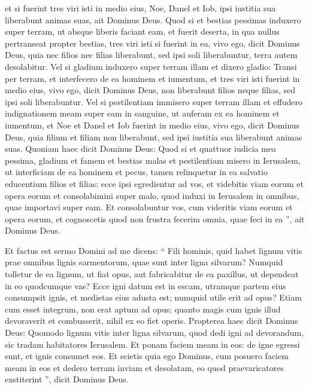 \begin{biblechapter}
\begin{biblechapter}
\begin{biblechapter}
\begin{biblechapter}
\begin{biblechapter}
\begin{biblechapter}
\begin{biblechapter}
\begin{biblechapter}
\begin{biblechapter}
\begin{biblechapter}
\begin{biblechapter}
\begin{biblechapter}
\begin{biblechapter}
\begin{biblechapter}
\verse et si fuerint tres viri isti in medio eius, Noe, Danel et Iob, ipsi iustitia sua liberabunt animas suas, ait Dominus Deus. 
\verse Quod si et bestias pessimas induxero super terram, ut absque liberis faciant eam, et fuerit deserta, in qua nullus pertranseat propter bestias, 
\verse tres viri isti si fuerint in ea, vivo ego, dicit Dominus Deus, quia nec filios nec filias liberabunt, sed ipsi soli liberabuntur, terra autem desolabitur. 
\verse Vel si gladium induxero super terram illam et dixero gladio: Transi per terram, et interfecero de ea hominem et iumentum, 
\verse et tres viri isti fuerint in medio eius, vivo ego, dicit Dominus Deus, non liberabunt filios neque filias, sed ipsi soli liberabuntur. 
\verse Vel si pestilentiam immisero super terram illam et effudero indignationem meam super eam in sanguine, ut auferam ex ea hominem et iumentum, 
\verse et Noe et Danel et Iob fuerint in medio eius, vivo ego, dicit Dominus Deus, quia filium et filiam non liberabunt, sed ipsi iustitia sua liberabunt animas suas.
 \verse Quoniam haec dicit Dominus Deus: Quod si et quattuor iudicia mea pessima, gladium et famem et bestias malas et pestilentiam misero in Ierusalem, ut interficiam de ea hominem et pecus, 
\verse tamen relinquetur in ea salvatio educentium filios et filias: ecce ipsi egredientur ad vos, et videbitis viam eorum et opera eorum et consolabimini super malo, quod induxi in Ierusalem in omnibus, quae importavi super eam. 
\verse Et consolabuntur vos, cum videritis viam eorum et opera eorum, et cognoscetis quod non frustra fecerim omnia, quae feci in ea ”, ait Dominus Deus.
 
\begin{biblechapter}
\verse Et factus est sermo Domini ad me dicens:
 \verse “ Fili hominis, quid habet lignum vitis
 prae omnibus lignis sarmentorum,
 quae sunt inter ligna silvarum?
 \verse Numquid tolletur de ea lignum,
 ut fiat opus,
 aut fabricabitur de ea paxillus,
 ut dependeat in eo quodcumque vas?
 \verse Ecce igni datum est in escam,
 utramque partem eius consumpsit ignis,
 et medietas eius adusta est;
 numquid utile erit ad opus?
 \verse Etiam cum esset integrum,
 non erat aptum ad opus;
 quanto magis cum ignis illud devoraverit et combusserit,
 nihil ex eo fiet operis.
 \verse Propterea haec dicit Dominus Deus:
 Quomodo lignum vitis inter ligna silvarum,
 quod dedi igni ad devorandum,
 sic tradam habitatores Ierusalem.
 \verse Et ponam faciem meam in eos:
 de igne egressi sunt,
 et ignis consumet eos.
 Et scietis quia ego Dominus,
 cum posuero faciem meam in eos
 \verse et dedero terram inviam et desolatam,
 eo quod praevaricatores exstiterint ”,
 dicit Dominus Deus.
 

\end{biblechapter}
\end{biblechapter}
\end{biblechapter}
\end{biblechapter}
\end{biblechapter}
\end{biblechapter}
\end{biblechapter}
\end{biblechapter}
\end{biblechapter}
\end{biblechapter}
\end{biblechapter}
\end{biblechapter}
\end{biblechapter}
\end{biblechapter}
\end{biblechapter}
